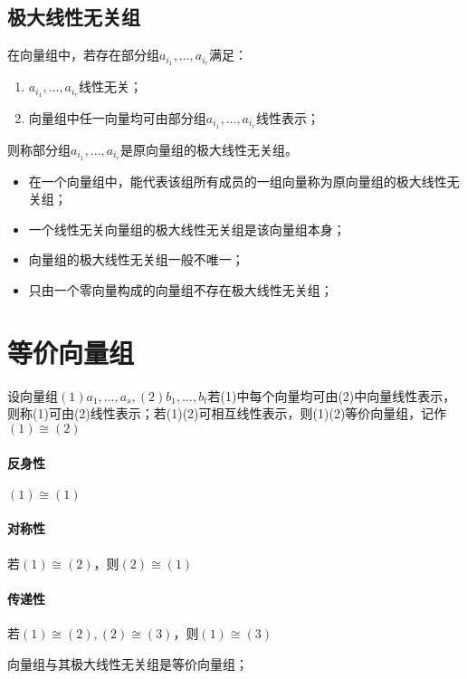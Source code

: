 \subsection{极大线性无关组}

在向量组中，若存在部分组\(a_{i_1},..., a_{i_r}\)满足：\begin{enumerate}
    \item \(a_{i_1},..., a_{i_r}\)线性无关；
    \item 向量组中任一向量均可由部分组\(a_{i_1},..., a_{i_r}\)线性表示；
\end{enumerate}
则称部分组\(a_{i_1},..., a_{i_r}\)是原向量组的极大线性无关组。
\begin{itemize}
    \item 在一个向量组中，能代表该组所有成员的一组向量称为原向量组的极大线性无关组；

    \item 一个线性无关向量组的极大线性无关组是该向量组本身；

    \item 向量组的极大线性无关组一般不唯一；

    \item 只由一个零向量构成的向量组不存在极大线性无关组；
\end{itemize}


\section{等价向量组}

设向量组\((1)a_1, ..., a_s, (2)b_1, ..., b_t\)若(1)中每个向量均可由(2)中向量线性表示，则称(1)可由(2)线性表示；若(1)(2)可相互线性表示，则(1)(2)等价向量组，记作\((1) \cong (2)\)

\paragraph{反身性}
\((1) \cong (1)\)

\paragraph{对称性}
若\((1) \cong (2)\)，则\((2) \cong (1)\)

\paragraph{传递性}
若\((1) \cong (2), (2) \cong (3)\)，则\((1) \cong (3)\)

向量组与其极大线性无关组是等价向量组；


